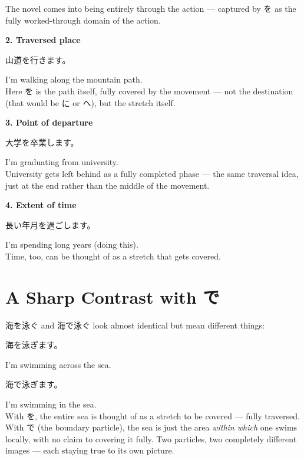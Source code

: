 \documentclass[12pt]{book}
\begin{document}
The novel comes into being entirely through the action — captured by を as the fully worked-through domain of the action.

\textbf{2. Traversed place}
\par\quad 山道を行きます。\\
\par\quad I'm walking along the mountain path.\\

Here を is the path itself, fully covered by the movement — not the destination (that would be に or へ), but the stretch itself.

\textbf{3. Point of departure}
\par\quad 大学を卒業します。\\
\par\quad I'm graduating from university.\\

University gets left behind as a fully completed phase — the same traversal idea, just at the end rather than the middle of the movement.

\textbf{4. Extent of time}
\par\quad 長い年月を過ごします。\\
\par\quad I'm spending long years (doing this).\\

Time, too, can be thought of as a stretch that gets covered.

\section*{A Sharp Contrast with で}

海を泳ぐ and 海で泳ぐ look almost identical but mean different things:

\par\quad 海を泳ぎます。\\
\par\quad I'm swimming across the sea.\\

\par\quad 海で泳ぎます。\\
\par\quad I'm swimming in the sea.\\

With を, the entire sea is thought of as a stretch to be covered — fully traversed. With で (the boundary particle), the sea is just the area \emph{within which} one swims locally, with no claim to covering it fully. Two particles, two completely different images — each staying true to its own picture.
\end{document}
